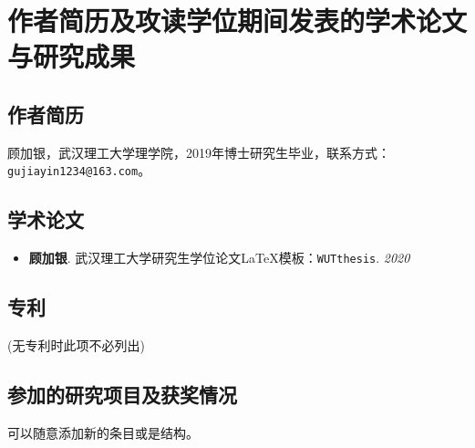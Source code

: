 \chapter{作者简历及攻读学位期间发表的学术论文与研究成果}

\section*{作者简历}

顾加银，武汉理工大学理学院，2019年博士研究生毕业，联系方式：\texttt{gujiayin1234@163.com}。

\section*{学术论文}



\begin{itemize}
\item \textbf{顾加银}. 武汉理工大学研究生学位论文{\LaTeX}模板：\texttt{WUTthesis}. \textit{2020}
\end{itemize}


\section*{专利}

(无专利时此项不必列出)

\section*{参加的研究项目及获奖情况}

可以随意添加新的条目或是结构。















